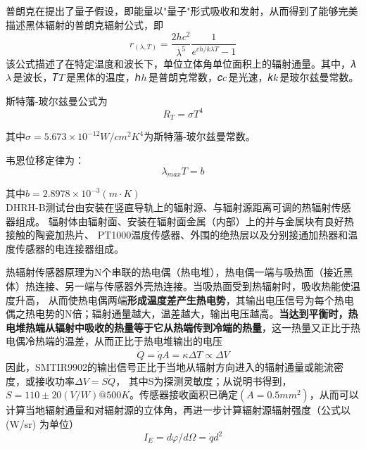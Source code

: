 \documentclass[dvipsnames, svgnames,a4paper,11pt]{article}
\begin{document}
	普朗克在提出了量子假设，即能量以"量子"形式吸收和发射，从而得到了能够完美描述黑体辐射的普朗克辐射公式，即
	\[
	r_{(\lambda,T)}=\frac{2 h c^2}{\lambda^5}\frac{1}{e^{ch/k\lambda T}-1}	
	\]
	该公式描述了在特定温度和波长下，单位立体角单位面积上的辐射通量。其中，𝜆${\displaystyle \lambda \,}$是波长，𝑇${\displaystyle T\,}$是黑体的温度，ℎ${\displaystyle h\,}$是普朗克常数，𝑐${\displaystyle c\,}$是光速，𝑘${\displaystyle k\,}$是玻尔兹曼常数。


	斯特藩-玻尔兹曼公式为
	\[
	R_T=\sigma T^4	
	\]

	其中$\sigma=5.673\times10^{-12}W/cm^2K^4$为斯特藩-玻尔兹曼常数。

	韦恩位移定律为：
	\[
	\lambda_{max}T=b	
	\]
		
	其中$b=2.8978\times10^{-3}( m· K )$\\

	DHRH-B测试台由安装在竖直导轨上的辐射源、与辐射源距离可调的热辐射传感器组成。 辐射体由辐射面、安装在辐射面金属（内部）上的并与金属块有良好热接触的陶瓷加热片、 PT1000温度传感器、外围的绝热层以及分别接通加热器和温度传感器的电连接器组成。

	热辐射传感器原理为N个串联的热电偶（热电堆），热电偶一端与吸热面（接近黑体）热连接、另一端与传感器外壳热连接。当吸热面受到热辐射时，吸收热能使温度升高， 从而使热电偶两端\textbf{形成温度差产生热电势}，其输出电压信号为每个热电偶之热电势的N倍；辐射通量越大，温差越大，输出电压越高。\textbf{当达到平衡时，热电堆热端从辐射中吸收的热量等于它从热端传到冷端的热量}，这一热量又正比于热电偶冷热端的温差，从而正比于热电堆输出的电压
	\[
		\dot{Q} = \dot{q} A = \kappa\Delta T \propto \Delta V
	\]
	因此，SMTIR9902的输出信号正比于当地从辐射方向进入的辐射通量或能流密度，或接收功率$\Delta V=S\dot{Q}$， 其中S为探测灵敏度；从说明书得到，$ S=110\pm20(V/W)@500K$。传感器接收面积已确定$(A= 0.5{mm}^2)$，从而可以计算当地辐射通量和对辐射源的立体角，再进一步计算辐射源辐射强度（公式以 (W/sr) 为单位）
	\[
		I_E= d\varphi /d\Omega=\dot{q}d^2
	\]\\
	
\end{document}
